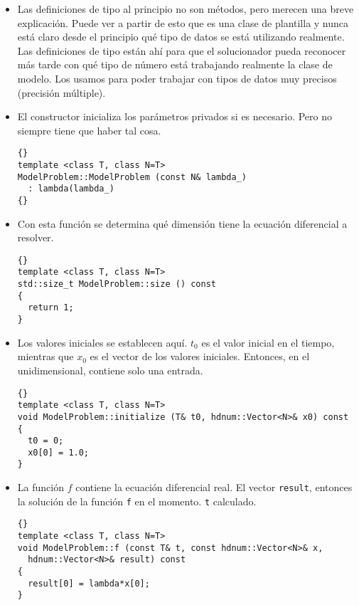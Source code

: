 \documentclass[a4paper,11pt]{article}
\theoremstyle{definition}
\begin{document}
\begin{itemize}
\item Las definiciones de tipo al principio no son métodos, pero merecen una breve explicación. Puede ver a partir de esto que es una clase de plantilla y nunca está claro desde el principio qué tipo de datos se está utilizando realmente. Las definiciones de tipo están ahí para que el solucionador pueda reconocer más tarde con qué tipo de número está trabajando realmente la clase de modelo. Los usamos para poder trabajar con tipos de datos muy precisos (precisión múltiple).

\item El constructor inicializa los parámetros privados si es necesario. Pero no siempre tiene que haber tal cosa.

  {\footnotesize{\begin{lstlisting}{}
template <class T, class N=T>
ModelProblem::ModelProblem (const N& lambda_)
  : lambda(lambda_)
{}
\end{lstlisting}}}

\item Con esta función se determina qué dimensión tiene la ecuación diferencial a resolver.

{\footnotesize{\begin{lstlisting}{}
template <class T, class N=T>
std::size_t ModelProblem::size () const
{
  return 1;
}
\end{lstlisting}}}

\item Los valores iniciales se establecen aquí. $t_0$ es el valor inicial en el tiempo, mientras que $x_0$ es el vector de los valores iniciales. Entonces, en el unidimensional, contiene solo una entrada.

{\footnotesize{\begin{lstlisting}{}
template <class T, class N=T>
void ModelProblem::initialize (T& t0, hdnum::Vector<N>& x0) const
{
  t0 = 0;
  x0[0] = 1.0;
}
\end{lstlisting}}}

\item La función $f$ contiene la ecuación diferencial real.  El vector
 \lstinline{result},
  entonces la solución de la función \lstinline{f} en el momento.
  \lstinline{t} calculado.

{\footnotesize{\begin{lstlisting}{}
template <class T, class N=T>
void ModelProblem::f (const T& t, const hdnum::Vector<N>& x,
  hdnum::Vector<N>& result) const
{
  result[0] = lambda*x[0];
}
\end{lstlisting}}}


\end{itemize}
\end{document}
